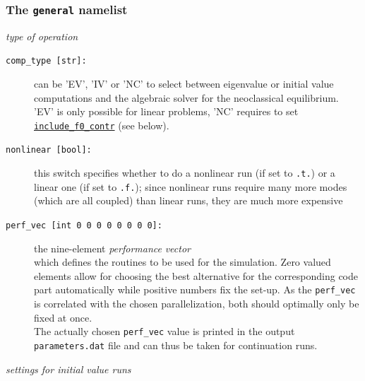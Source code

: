 \documentclass[12pt]{article}
\begin{document}
\subsubsection{The \texttt{general} namelist}
%
{\em type of operation}
\begin{description}
\item[\hypertarget{comp_type}{\texttt{comp\_type [str]:}}] can be 'EV', 'IV' or 'NC' to select between eigenvalue or initial value
computations and the algebraic solver for the neoclassical equilibrium. 'EV' is only possible for linear problems, 'NC' requires to set
\hyperlink{include_f0_contr}{\tt include\_f0\_contr} (see below).
\item[\texttt{nonlinear [bool]:}] this switch specifies whether to do a nonlinear run (if set to
\texttt{.t.}) or a linear one (if set to \texttt{.f.}); since nonlinear runs require many more
modes (which are all coupled) than linear runs, they are much more expensive
\item[\hypertarget{perf_vec}{\tt perf\_vec [int 0 0 0 0 0 0 0 0]:}] the nine-element 
{\em performance} {\em vector}\\ which defines the routines to be used for the simulation. 
Zero valued elements allow for choosing the best alternative for the corresponding code part 
automatically while positive numbers fix the set-up. As the {\tt perf\_vec} is correlated 
with the chosen parallelization, both should optimally only be fixed at once.\\
The actually chosen {\tt perf\_vec} value is printed in the output {\tt para\-me\-ters.dat} file and 
can thus be taken for continuation runs.
\end{description}
%
{\em settings for initial value runs}
\end{document}
